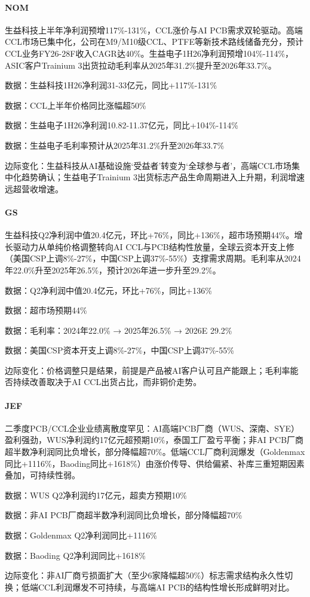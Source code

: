 \documentclass[11pt]{ctexart}
\begin{document}
\paragraph{NOM} 生益科技上半年净利润预增117\%-131\%，CCL涨价与AI PCB需求双轮驱动。高端CCL市场已集中化，公司在M9/M10级CCL、PTFE等新技术路线储备充分，预计CCL业务FY26-28F收入CAGR达40\%。生益电子1H26净利润预增104\%-114\%，ASIC客户Trainium 3出货拉动毛利率从2025年31.2\%提升至2026年33.7\%。
{\small\color{refgray}数据：生益科技1H26净利润31-33亿元，同比+117\%-131\%\par}
{\small\color{refgray}数据：CCL上半年价格同比涨幅超50\%\par}
{\small\color{refgray}数据：生益电子1H26净利润10.82-11.37亿元，同比+104\%-114\%\par}
{\small\color{refgray}数据：生益电子毛利率预计从2025年31.2\%升至2026年33.7\%\par}
{\small\color{refgray}边际变化：生益科技从AI基础设施‘受益者’转变为‘全球参与者’，高端CCL市场集中化趋势确认；生益电子Trainium 3出货标志产品生命周期进入上升期，利润增速远超营收增速。\par}
\paragraph{GS} 生益科技Q2净利润中值20.4亿元，环比+76\%，同比+136\%，超市场预期44\%。增长驱动力从单纯价格调整转向AI CCL与PCB结构性放量，全球云资本开支上修（美国CSP上调8\%-27\%，中国CSP上调37\%-55\%）支撑需求周期。毛利率从2024年22.0\%升至2025年26.5\%，预计2026年进一步升至29.2\%。
{\small\color{refgray}数据：Q2净利润中值20.4亿元，环比+76\%，同比+136\%\par}
{\small\color{refgray}数据：超市场预期44\%\par}
{\small\color{refgray}数据：毛利率：2024年22.0\% → 2025年26.5\% → 2026E 29.2\%\par}
{\small\color{refgray}数据：美国CSP资本开支上调8\%-27\%，中国CSP上调37\%-55\%\par}
{\small\color{refgray}边际变化：价格调整只是结果，前提是产品被AI客户认可且产能跟上；毛利率能否持续改善取决于AI CCL出货占比，而非铜价走势。\par}
\paragraph{JEF} 二季度PCB/CCL企业业绩离散度罕见：AI高端PCB厂商（WUS、深南、SYE）盈利强劲，WUS净利润约17亿元超预期10\%，泰国工厂盈亏平衡；非AI PCB厂商超半数净利润同比负增长，部分降幅超70\%。低端CCL厂商利润爆发（Goldenmax同比+1116\%，Baoding同比+1618\%）由涨价传导、供给偏紧、补库三重短期因素叠加，可持续性弱。
{\small\color{refgray}数据：WUS Q2净利润约17亿元，超卖方预期10\%\par}
{\small\color{refgray}数据：非AI PCB厂商超半数净利润同比负增长，部分降幅超70\%\par}
{\small\color{refgray}数据：Goldenmax Q2净利润同比+1116\%\par}
{\small\color{refgray}数据：Baoding Q2净利润同比+1618\%\par}
{\small\color{refgray}边际变化：非AI厂商亏损面扩大（至少6家降幅超50\%）标志需求结构永久性切换；低端CCL利润爆发不可持续，与高端AI PCB的结构性增长形成鲜明对比。\par}
\end{document}
